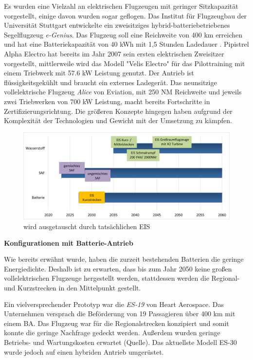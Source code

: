 Es wurden eine Vielzahl an elektrischen Flugzeugen mit geringer 
Sitzkapazität vorgestellt, einige davon wurden sogar geflogen.
Das Institut für Flugzeugbau der Universität Stuttgart entwickelte 
ein zweisitziges hybrid-batteriebetriebenes Segelflugzeug \textit{e-Genius}. 
Das Flugzeug soll eine Reichweite von 400 km erreichen und hat eine 
Batteriekapazität von 40 kWh mit 1,5 Stunden Ladedauer \cite{IFB_eGenius_2025}.
Pipistrel Alpha Electro hat bereits im Jahr 2007 sein ersten elektrischen Zweisitzer vorgestellt, 
mittlerweile wird das Modell "Velis Electro" \cite{Pipistrel_VelisElectro} für 
das Pilottraining mit einem Triebwerk mit 57.6 kW Leistung genutzt. 
Der Antrieb ist flüssigkeitsgekühlt und braucht ein externes Ladegerät. 
Das neunsitzige vollelektrische Flugzeug \textit{Alice} von Eviation, 
mit 250 NM Reichweite und jeweils zwei Triebwerken von 700 kW Leistung,
macht bereits Fortschritte in Zertifizierungsrichtung.
%
Die größeren Konzepte hingegen haben aufgrund der Komplexität der Technologien 
und Gewicht mit der Umsetzung zu kämpfen.\\
\begin{figure}[h]
	\centering
	\includegraphics[width=0.7\linewidth]{Bilder/eis.png}
	\caption[Eintrittsjahren ]{ wird ausgetauscht durch tatsächlichen EIS}
	\label{eis_konzepte}
\end{figure}

\textbf{Konfigurationen mit Batterie-Antrieb}

Wie bereits erwähnt wurde, haben die zurzeit bestehenden Batterien die geringe Energiedichte. 
Deshalb ist zu erwarten, dass bis zum Jahr 2050 keine großen vollelektrischen Flugzeuge hergestellt werden, 
stattdessen werden die Regional- und Kurzstrecken in den Mittelpunkt gestellt.

Ein vielversprechender Prototyp war die \textit{ES-19} von Heart Aerospace. 
Das Unternehmen versprach die Beförderung von 19 Passagieren über 400 km mit einem BA. 
Das Flugzeug war für die Regionalstrecken konzipiert und 
somit konnte die geringe Nachfrage gedeckt werden. 
Außerdem wurden geringe Betriebs- und Wartungskosten erwartet (Quelle).
Das aktuellste Modell ES-30 wurde jedoch auf einen hybriden Antrieb umgerüstet.


